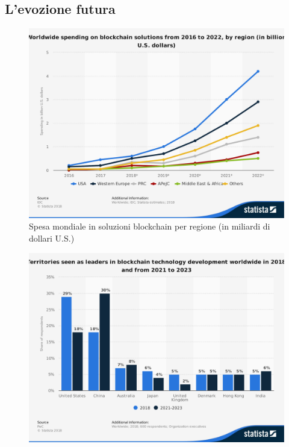 \subsection{L'evozione futura}
\begin{figure}[H]
	\centering
	\includegraphics[width=.75\linewidth]{images/chap_intro/global-blockchain-solutions-spending.pdf}
	\caption{Spesa mondiale in soluzioni blockchain per regione (in miliardi di
		dollari U.S.) \cite{global-blockchain-solutions-spending}}
\end{figure}
\begin{figure}[H]
	\centering
	\includegraphics[width=.75\linewidth]{images/chap_intro/leading-territories-worldwide.pdf}
	\caption{
		\cite{leading-territories-worldwide}}
\end{figure}

